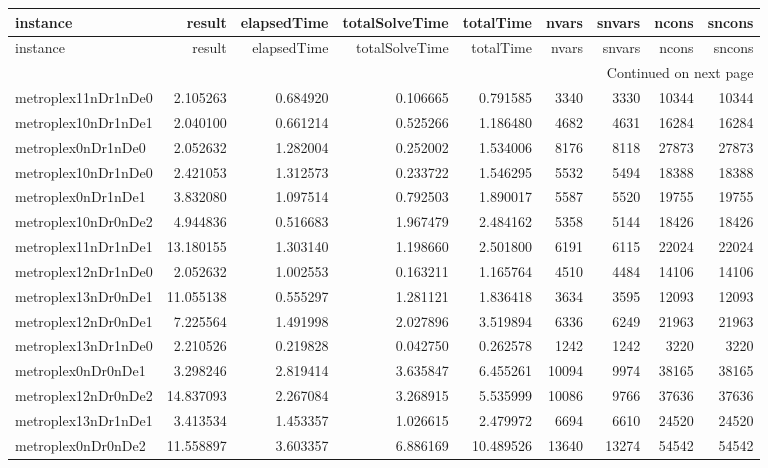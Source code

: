 \begin{longtable}{|l|r|r|r|r|r|r|r|r|}
\toprule
instance & result & elapsedTime & totalSolveTime & totalTime & nvars & snvars & ncons & sncons \\
\midrule
\endfirsthead
\toprule
instance & result & elapsedTime & totalSolveTime & totalTime & nvars & snvars & ncons & sncons \\
\midrule
\endhead
\midrule
\multicolumn{9}{r}{Continued on next page} \\
\midrule
\endfoot
\bottomrule
\endlastfoot
metroplex11nDr1nDe0 & 2.105263 & 0.684920 & 0.106665 & 0.791585 & 3340 & 3330 & 10344 & 10344 \\
metroplex10nDr1nDe1 & 2.040100 & 0.661214 & 0.525266 & 1.186480 & 4682 & 4631 & 16284 & 16284 \\
metroplex0nDr1nDe0 & 2.052632 & 1.282004 & 0.252002 & 1.534006 & 8176 & 8118 & 27873 & 27873 \\
metroplex10nDr1nDe0 & 2.421053 & 1.312573 & 0.233722 & 1.546295 & 5532 & 5494 & 18388 & 18388 \\
metroplex0nDr1nDe1 & 3.832080 & 1.097514 & 0.792503 & 1.890017 & 5587 & 5520 & 19755 & 19755 \\
metroplex10nDr0nDe2 & 4.944836 & 0.516683 & 1.967479 & 2.484162 & 5358 & 5144 & 18426 & 18426 \\
metroplex11nDr1nDe1 & 13.180155 & 1.303140 & 1.198660 & 2.501800 & 6191 & 6115 & 22024 & 22024 \\
metroplex12nDr1nDe0 & 2.052632 & 1.002553 & 0.163211 & 1.165764 & 4510 & 4484 & 14106 & 14106 \\
metroplex13nDr0nDe1 & 11.055138 & 0.555297 & 1.281121 & 1.836418 & 3634 & 3595 & 12093 & 12093 \\
metroplex12nDr0nDe1 & 7.225564 & 1.491998 & 2.027896 & 3.519894 & 6336 & 6249 & 21963 & 21963 \\
metroplex13nDr1nDe0 & 2.210526 & 0.219828 & 0.042750 & 0.262578 & 1242 & 1242 & 3220 & 3220 \\
metroplex0nDr0nDe1 & 3.298246 & 2.819414 & 3.635847 & 6.455261 & 10094 & 9974 & 38165 & 38165 \\
metroplex12nDr0nDe2 & 14.837093 & 2.267084 & 3.268915 & 5.535999 & 10086 & 9766 & 37636 & 37636 \\
metroplex13nDr1nDe1 & 3.413534 & 1.453357 & 1.026615 & 2.479972 & 6694 & 6610 & 24520 & 24520 \\
metroplex0nDr0nDe2 & 11.558897 & 3.603357 & 6.886169 & 10.489526 & 13640 & 13274 & 54542 & 54542 \\

\end{longtable}
